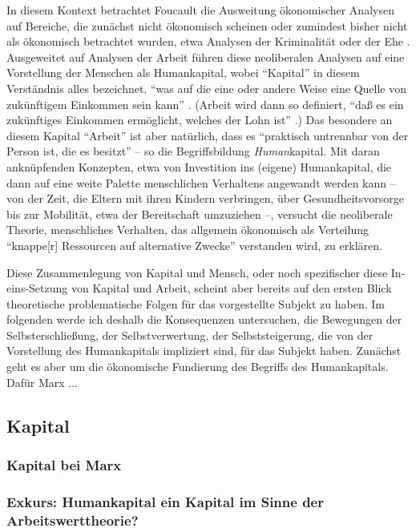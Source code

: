 \documentclass[12pt,
               DIV13,
               paper=a4,
               twoside=false,
               onehalfspacing,
               bibliography=totoc,
               toc=graduated,
               draft,
               ]{scrartcl}
\newcommand{\tit}[1]{\textit{#1}}
\newcommand{\pc}[2]{\parencite[#1]{#2}}
\newcommand{\vgl}[2]{\parencite[vgl.][#1]{#2}}
\newcommand{\worries}[1]{\ifdraft{\textcolor{blue}{\texttt{(#1)}}}{}}
\begin{document}
In diesem Kontext betrachtet Foucault die Ausweitung ökonomischer
Analysen auf Bereiche, die zunächst nicht ökonomisch scheinen oder
zumindest bisher nicht als ökonomisch betrachtet wurden, etwa Analysen
der Kriminalität oder der Ehe \vgl{367}{gbp}. Ausgeweitet auf Analysen
der Arbeit führen diese neoliberalen Analysen auf eine Vorstellung der
Menschen als Humankapital, wobei "`Kapital"' in diesem Verständnis
alles bezeichnet, "`was auf die eine oder andere Weise eine Quelle von
zukünftigem Einkommen sein kann"' \pc{312}{gbp}. (Arbeit wird dann so
definiert, "`daß es ein zukünftiges Einkommen ermöglicht, welches der
Lohn ist"' \pc{312}{gbp}.) Das besondere an diesem Kapital "`Arbeit"'
ist aber natürlich, dass es "`praktisch untrennbar von der Person ist,
die es besitzt"' \pc{312}{gbp} -- so die Begriffsbildung
\tit{Human}kapital. Mit daran anknüpfenden Konzepten, etwa von
Investition ins (eigene) Humankapital, die dann auf eine weite Palette
menschlichen Verhaltens angewandt werden kann -- von der Zeit, die
Eltern mit ihren Kindern verbringen, über Gesundheitsvorsorge bis zur
Mobilität, etwa der Bereitschaft umzuziehen \vgl{320}{gbp} --,
versucht die neoliberale Theorie, menschliches Verhalten, das
allgemein ökonomisch als Verteilung "`knappe[r] Ressourcen auf
alternative Zwecke"' \pc{310}{gbp} verstanden wird, zu erklären.

Diese Zusammenlegung von Kapital und Mensch, oder noch spezifischer
diese In-eins-Set\-zung von Kapital und Arbeit, scheint aber bereits auf
den ersten Blick theoretische problematische Folgen für das
vorgestellte Subjekt zu haben. Im folgenden werde ich deshalb die
Konsequenzen untersuchen, die Bewegungen der Selbsterschließung, der
Selbstverwertung, der Selbststeigerung, die von der Vorstellung des
Humankapitals impliziert sind, für das Subjekt haben. Zunächst geht es
aber um die ökonomische Fundierung des Begriffs des
Humankapitals. Dafür Marx ...

\worries{Warum Marx?}

\subsection{Kapital}

\subsubsection{Kapital bei Marx}

\subsubsection{Exkurs: Humankapital ein Kapital im Sinne der
Arbeitswerttheorie?}
\end{document}
